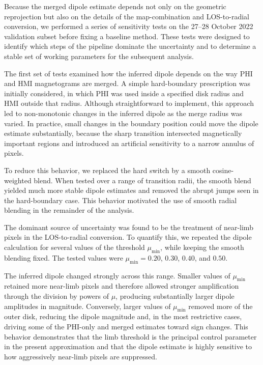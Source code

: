 \documentclass[namedreferences,hyperref,optionalrh]{spr-sola}
\begin{document}
Because the merged dipole estimate depends not only on the geometric reprojection but also on the details of the map-combination and LOS-to-radial conversion, we performed a series of sensitivity tests on the 27--28 October 2022 validation subset before fixing a baseline method. These tests were designed to identify which steps of the pipeline dominate the uncertainty and to determine a stable set of working parameters for the subsequent analysis.


The first set of tests examined how the inferred dipole depends on the way PHI and HMI magnetograms are merged. A simple hard-boundary prescription was initially considered, in which PHI was used inside a specified disk radius and HMI outside that radius. Although straightforward to implement, this approach led to non-monotonic changes in the inferred dipole as the merge radius was varied. In practice, small changes in the boundary position could move the dipole estimate substantially, because the sharp transition intersected magnetically important regions and introduced an artificial sensitivity to a narrow annulus of pixels.

To reduce this behavior, we replaced the hard switch by a smooth cosine-weighted blend. When tested over a range of transition radii, the smooth blend yielded much more stable dipole estimates and removed the abrupt jumps seen in the hard-boundary case. This behavior motivated the use of smooth radial blending in the remainder of the analysis.


The dominant source of uncertainty was found to be the treatment of near-limb pixels in the LOS-to-radial conversion. To quantify this, we repeated the dipole calculation for several values of the threshold $\mu_{\min}$, while keeping the smooth blending fixed. The tested values were $\mu_{\min}=0.20$, $0.30$, $0.40$, and $0.50$.

The inferred dipole changed strongly across this range. Smaller values of $\mu_{\min}$ retained more near-limb pixels and therefore allowed stronger amplification through the division by powers of $\mu$, producing substantially larger dipole amplitudes in magnitude. Conversely, larger values of $\mu_{\min}$ removed more of the outer disk, reducing the dipole magnitude and, in the most restrictive cases, driving some of the PHI-only and merged estimates toward sign changes. This behavior demonstrates that the limb threshold is the principal control parameter in the present approximation and that the dipole estimate is highly sensitive to how aggressively near-limb pixels are suppressed.
\end{document}
